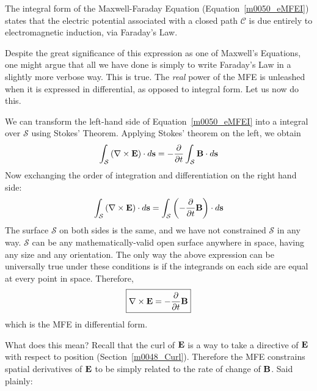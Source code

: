 \begin{mdframed}[backgroundcolor=yellow!20,nobreak=true] 
The integral form of the Maxwell-Faraday Equation (Equation~\ref{m0050_eMFEI}) states that the electric potential associated with a closed path $\mathcal{C}$ is due entirely to  electromagnetic induction, via Faraday's Law. 
\end{mdframed}

Despite the great significance of this expression as one of Maxwell's Equations, one might argue that all we have done is simply to write Faraday's Law in a slightly more verbose way.  This is true.  The \emph{real} power of the MFE is unleashed when it is expressed in differential, as opposed to integral form.  Let us now do this. 

We can transform the left-hand side of Equation~\ref{m0050_eMFEI} into a integral over $\mathcal{S}$ using Stokes' Theorem.
Applying Stokes' theorem on the left, we obtain 
%
\begin{equation}   
\int_{\mathcal{S}} { \left( \nabla \times {\bf E} \right) \cdot d{\bf s}  }  = - \frac{\partial}{\partial t} \int_{\mathcal{S}} { {\bf B} \cdot d{\bf s} }
\end{equation}
%
Now exchanging the order of integration and differentiation on the right hand side:
%
\begin{equation}   
\int_{\mathcal{S}} { \left( \nabla \times {\bf E} \right) \cdot d{\bf s}  } = \int_{\mathcal{S}} { \left( - \frac{\partial}{\partial t}{\bf B} \right) \cdot d{\bf s} }
\end{equation}
% 
The surface $\mathcal{S}$ on both sides is the same, and we have not constrained $\mathcal{S}$ in any way. $\mathcal{S}$ can be any mathematically-valid open surface anywhere in space, having any size and any orientation.
The only way the above expression can be universally true under these conditions is if the integrands on each side are equal at every point in space.
Therefore,
%
\begin{equation}   
\boxed{
\nabla \times {\bf E} = - \frac{\partial}{\partial t}{\bf B}
}
\label{m0050_eMFED}
\end{equation}
%
which is the MFE in differential form.

What does this mean? Recall that the curl of ${\bf E}$ is a way to take a directive of ${\bf E}$ with respect to position (Section~\ref{m0048_Curl}).  Therefore the MFE constrains spatial derivatives of ${\bf E}$ to be simply related to the rate of change of ${\bf B}$.  Said plainly:

